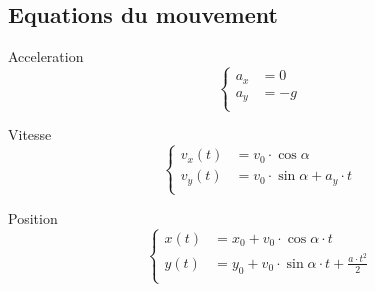 \documentclass[12pt,a4paper]{article} %
\begin{document}
\subsection{Equations du mouvement}
\begin{twocols}[0.5][0.5]
	Acceleration
	\begin{equation*}
	\left\{
		\begin{aligned}
			a_x &= 0 \\
			a_y &= -g \\
		\end{aligned}
	\right.
	\end{equation*}
	\par\vspace{1em}
	Vitesse
	\begin{equation*}
	\left\{
		\begin{aligned}
			v_x(t) &= v_0 \cdot \cos{\alpha} \\
			v_y(t) &= v_0 \cdot \sin{\alpha}+a_y \cdot t \\
		\end{aligned}
	\right.
	\end{equation*}
\nextcol

	Position
	\begin{equation*}
	\left\{
		\begin{aligned}
			x(t) &= x_0+v_0 \cdot \cos{\alpha} \cdot t \\
			y(t) &= y_0+v_0 \cdot \sin{\alpha} \cdot t+{\displaystyle\frac{a \cdot t^2}{2}} \\
		\end{aligned}
	\right.
	\end{equation*}

\end{twocols}
\end{document}
